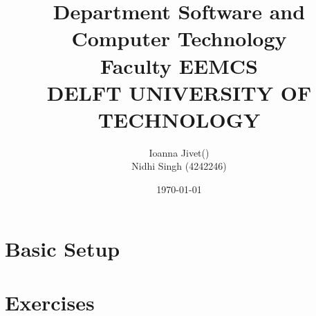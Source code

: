 \documentclass[a4paper,10pt]{article}
\begin{document}
\title{\flushleft\small{Department Software and Computer Technology\\ 
Faculty EEMCS\\
DELFT UNIVERSITY OF TECHNOLOGY\\}
}
\author{Ioanna Jivet() \\
Nidhi Singh (4242246)}
        
\date{\today}
    
\maketitle

\section{Basic Setup}
\section{Exercises}
\end{document}
